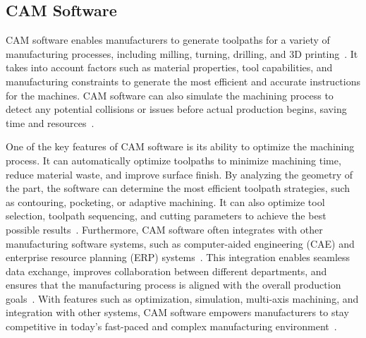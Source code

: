 \subsection{\acrshort{CAM} Software}


\acrshort{CAM} software enables manufacturers to generate toolpaths for a variety of manufacturing processes, including milling, turning, drilling, and 3D printing~\cite{Kumar.2019}. It takes into account factors such as material properties, tool capabilities, and manufacturing constraints to generate the most efficient and accurate instructions for the machines. \acrshort{CAM} software can also simulate the machining process to detect any potential collisions or issues before actual production begins, saving time and resources~\cite{Bui.2019}.

One of the key features of \acrshort{CAM} software is its ability to optimize the machining process. It can automatically optimize toolpaths to minimize machining time, reduce material waste, and improve surface finish. By analyzing the geometry of the part, the software can determine the most efficient toolpath strategies, such as contouring, pocketing, or adaptive machining. It can also optimize tool selection, toolpath sequencing, and cutting parameters to achieve the best possible results~\cite{Kyratsis.2020}. %
Furthermore, \acrshort{CAM} software often integrates with other manufacturing software systems, such as computer-aided engineering (\acrshort{CAE}) and enterprise resource planning (\acrshort{ERP}) systems~\cite{Ramazanov.2020}. This integration enables seamless data exchange, improves collaboration between different departments, and ensures that the manufacturing process is aligned with the overall production goals~\cite{Kadam.2023}. With features such as optimization, simulation, multi-axis machining, and integration with other systems, \acrshort{CAM} software empowers manufacturers to stay competitive in today's fast-paced and complex manufacturing environment~\cite{Kappmeyer.2021}.

